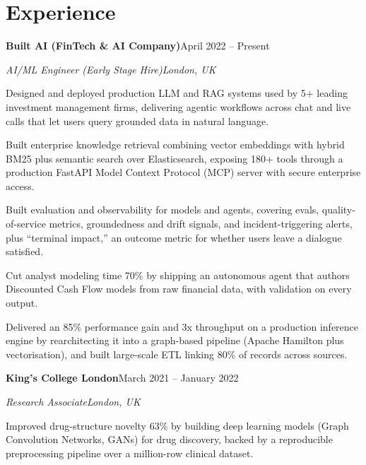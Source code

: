 \documentclass[10pt,a4paper]{article}
\newcommand{\entry}[4]{%
  {\color{company}\bfseries #1}\hfill {\color{muted}#2}\par
  \vspace{1pt}
  {\itshape #3}\hfill {\color{muted}\itshape #4}\par
  \vspace{3pt}%
}
\begin{document}
\section{Experience}
\entry{Built AI (FinTech \& AI Company)}{April 2022 -- Present}{AI/ML Engineer (Early Stage Hire)}{London, UK}
\begin{tight}
  \item Designed and deployed production LLM and RAG systems used by 5+ leading investment management firms, delivering agentic workflows across chat and live calls that let users query grounded data in natural language.
  \item Built enterprise knowledge retrieval combining vector embeddings with hybrid BM25 plus semantic search over Elasticsearch, exposing 180+ tools through a production FastAPI Model Context Protocol (MCP) server with secure enterprise access.
  \item Built evaluation and observability for models and agents, covering evals, quality-of-service metrics, groundedness and drift signals, and incident-triggering alerts, plus ``terminal impact,'' an outcome metric for whether users leave a dialogue satisfied.
  \item Cut analyst modeling time 70\% by shipping an autonomous agent that authors Discounted Cash Flow models from raw financial data, with validation on every output.
  \item Delivered an 85\% performance gain and 3x throughput on a production inference engine by rearchitecting it into a graph-based pipeline (Apache Hamilton plus vectorisation), and built large-scale ETL linking 80\% of records across sources.
\end{tight}

\entry{King's College London}{March 2021 -- January 2022}{Research Associate}{London, UK}
\begin{tight}
  \item Improved drug-structure novelty 63\% by building deep learning models (Graph Convolution Networks, GANs) for drug discovery, backed by a reproducible preprocessing pipeline over a million-row clinical dataset.
\end{tight}

\end{document}
